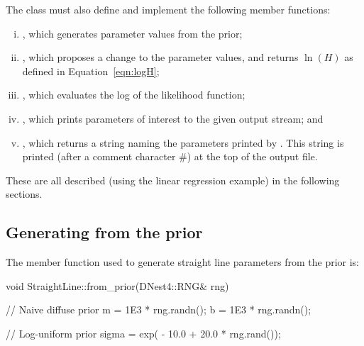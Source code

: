 \documentclass[article, nojss]{jss}
\begin{document}
The class must also define and implement the following member functions:
\begin{enumerate}[(i)]
\item {}, which generates parameter
        values from the prior;
\item {}, which proposes a
        change to the parameter values, and returns $\ln(H)$ as defined in
        Equation~\ref{eqn:logH};
\item {}, which evaluates the log of
        the likelihood function;
\item {}, which prints parameters of
        interest to the given output stream; and
\item {}, which returns a 
        string naming the parameters printed by .
        This string is printed (after a comment character \#) at the top of
        the output file.
\end{enumerate}
These are all described (using the linear regression example) in the
following sections.





\subsection{Generating from the prior}
The member function used to generate straight line parameters from the
prior is:
\begin{CodeChunk}
\begin{CodeInput}
void StraightLine::from_prior(DNest4::RNG& rng)
{
   // Naive diffuse prior
   m = 1E3 * rng.randn();
   b = 1E3 * rng.randn();

   // Log-uniform prior
   sigma = exp( - 10.0 + 20.0 * rng.rand());
}
\end{CodeInput}
\end{CodeChunk}
\end{document}
